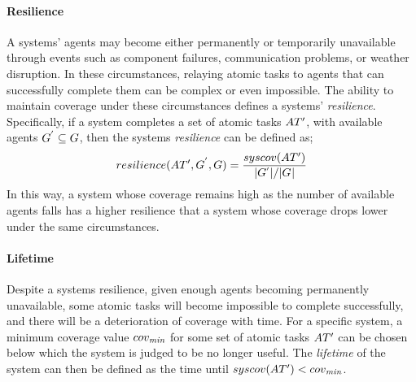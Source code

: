 \newcommand{\functionSymbolResilence}[2]{\functionSymbol{resilience}{#1}{#2}}
\newcommand{\functionResilence}[2]{
	\functionSignature{\functionSymbolResilence{#1}{#2}}
	{\setAtomicTaskInstance{}{}, \setAgent{}{'}, \setAgent{}{} }
}
\paragraph{Resilience}
\label{section:resilience}
A systems' agents may become either permanently or temporarily unavailable through events such as component failures, communication problems, or weather disruption. In these circumstances, relaying atomic tasks to agents that can successfully complete them can be complex or even impossible.
 The ability to maintain coverage under these circumstances defines a systems' \textit{resilience}. Specifically, if a system completes a set of atomic tasks $\setAtomicTaskInstance{}{}$, with available agents $\setAgent{}{'} \subseteq \setAgent{}{}$, then the systems \textit{resilience} can be defined as; 
\begin{equation}
	\functionResilence{}{}
	= 
	\frac{
		\functionSystemCoverage{}{}
	}{
		\funcSize{\setAgents{}{'}} / \funcSize{\setAgents{}{}}
	}
\end{equation}
In this way, a system whose coverage remains high as the number of available agents falls has a higher resilience that a system whose coverage drops lower under the same circumstances.


 \newcommand{\varCoverageMinimum}[2]{\varSymbol{cov}{\textit{min}}{}}
 \paragraph{Lifetime}
 \label{section:lifetime}
 Despite a systems resilience, given enough agents becoming permanently unavailable, some atomic tasks will become impossible to complete successfully, and there will be a deterioration of coverage with time. For a specific system, a minimum coverage value $\varCoverageMinimum{}{}$ for some set of atomic tasks $\setAtomicTaskInstance{}{}$ can be chosen below which the system is judged to be no longer useful. The \textit{lifetime} of the system can then be defined as the time until $\functionSystemCoverage{}{} < \varCoverageMinimum{}{}$.
 
 
